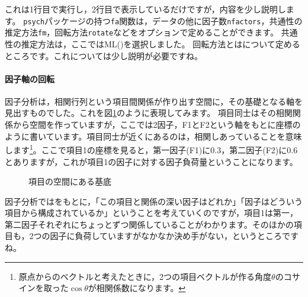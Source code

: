 \documentclass{ltjsbook}
\begin{document}
これは1行目で実行し，2行目で表示しているだけですが，内容を少し説明します。
\texttt{psych}パッケージの持つ\texttt{fa}関数は，データの他に因子数\texttt{nfactors}，共通性の推定方法\texttt{fm}，回転方法\texttt{rotate}などをオプションで定めることができます。
共通性の推定方法は，ここではML()を選択しました。
回転方法とはについて定めるところです。これについては少し説明が必要ですね。

\paragraph{因子軸の回転}
因子分析は，相関行列という項目間関係が作り出す空間に，その基礎となる軸を見出すものでした。これを図\ref{fig:10_02}のように表現してみます。
項目同士はその相関関係から空間を作っていますが，ここでは2因子，F1とF2という軸をもとに座標のように書いています。項目同士が近くにあるのは，相関しあっていることを意味します\footnote{原点からのベクトルと考えたときに，2つの項目ベクトルが作る角度$\theta$のコサインを取った$\cos \theta$が相関係数になります。}。ここで項目1の座標を見ると，第一因子(F1)に0.3，第二因子(F2)に0.6とありますが，これが項目1の因子に対する因子負荷量ということになります。
\begin{figure}[ht]
	\centering
	\caption{項目の空間にある基底}
	\label{fig:10_02}
\end{figure}

因子分析ではをもとに，「この項目と関係の深い因子はどれか」「因子はどういう項目から構成されているか」ということを考えていくのですが，項目1は第一，第二因子それぞれにちょっとずつ関係していることがわかります。そのほかの項目も，2つの因子に負荷していますがなかなか決め手がない，というところですね。
\end{document}
